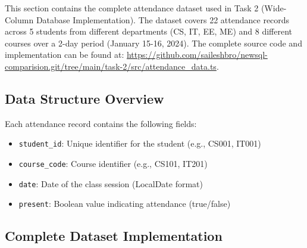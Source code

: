 This section contains the complete attendance dataset used in Task 2 (Wide-Column Database Implementation). The dataset covers 22 attendance records across 5 students from different departments (CS, IT, EE, ME) and 8 different courses over a 2-day period (January 15-16, 2024). The complete source code and implementation can be found at: \url{https://github.com/saileshbro/newsql-comparision.git/tree/main/task-2/src/attendance_data.ts}.

\subsection{Data Structure Overview}

Each attendance record contains the following fields:
\begin{itemize}
    \item \texttt{student\_id}: Unique identifier for the student (e.g., CS001, IT001)
    \item \texttt{course\_code}: Course identifier (e.g., CS101, IT201)
    \item \texttt{date}: Date of the class session (LocalDate format)
    \item \texttt{present}: Boolean value indicating attendance (true/false)
\end{itemize}

\subsection{Complete Dataset Implementation}

